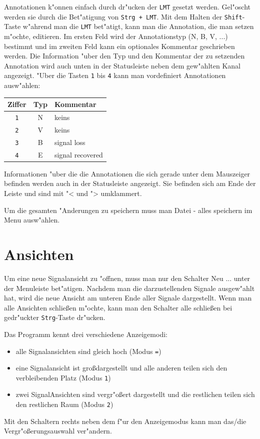 Annotationen k"onnen einfach durch dr"ucken der \verb|LMT| gesetzt werden.
Gel"oscht werden sie durch die Bet"atigung von \verb|Strg + LMT|.
Mit dem Halten der \verb|Shift|-Taste w"ahrend man die \verb|LMT| bet"atigt, kann man die Annotation, die man setzen m"ochte, editieren.
Im ersten Feld wird der Annotationstyp (N, B, V, ...) bestimmt und im zweiten Feld kann ein optionales Kommentar geschrieben werden.
Die Information "uber den Typ und den Kommentar der zu setzenden Annotation wird auch unten in der Statusleiste neben dem gew"ahlten Kanal angezeigt.
"Uber die Tasten \verb|1| bis \verb|4| kann man vordefiniert Annotationen ausw"ahlen:

\noindent
\begin{tabular}{c|c|l}
	\textbf{Ziffer} & \textbf{Typ} & \textbf{Kommentar} \\ \hline
	\verb|1| & N & keins \\
	\verb|2| & V & keins \\
	\verb|3| & B & signal loss\\
	\verb|4| & E & signal recovered\\
\end{tabular}

Informationen "uber die die Annotationen die sich gerade unter dem Mauszeiger befinden werden auch in der Statusleiste angezeigt.
Sie befinden sich am Ende der Leiste und sind mit "< und "> umklammert.

Um die gesamten "Anderungen zu speichern muss man \textsf{Datei - alles speichern} im Menu ausw"ahlen.

\section{Ansichten}

Um eine neue Signalansicht zu "offnen, muss man nur den Schalter \textsf{Neu ...} unter der Menuleiste bet"atigen.
Nachdem man die darzustellenden Signale ausgew"ahlt hat, wird die neue Ansicht am unteren Ende aller Signale dargestellt.
Wenn man alle Ansichten schlie\ss en m"ochte, kann man den Schalter \textsf{alle schlie\ss en} bei gedr"uckter \verb|Strg|-Taste dr"ucken.

Das Programm kennt drei verschiedene Anzeigemodi:
\begin{itemize}
	\item alle Signalansichten sind gleich hoch (Modus \verb|=|)
	\item eine Signalansicht ist gro\ss dargestellt und alle anderen teilen sich den verbleibenden Platz (Modus \verb|1|)
	\item zwei SignalAnsichten sind vergr"o\ss ert dargestellt und die restlichen teilen sich den restlichen Raum (Modus \verb|2|)
\end{itemize}
Mit den Schaltern rechts neben dem f"ur den Anzeigemodus kann man das/die Vergr"o\ss erungsauswahl ver"andern.
